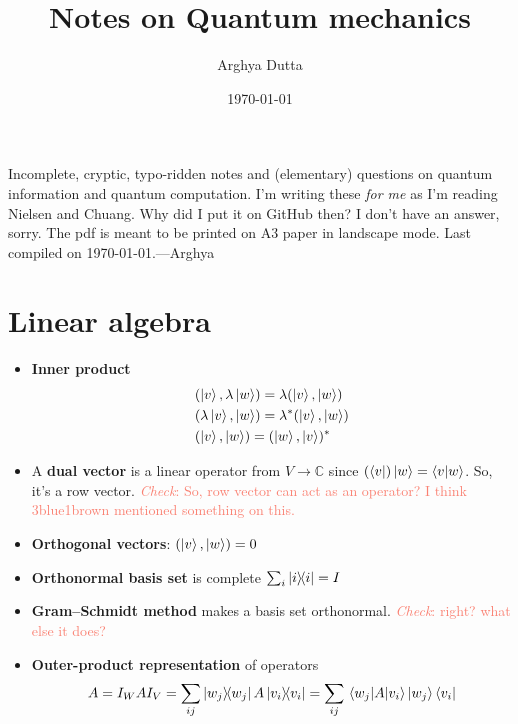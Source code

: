 \documentclass[11pt]{article}
\title{Notes on Quantum mechanics}
\author{Arghya Dutta}
\date{\today}
\newcommand{\q}[1]{\textcolor{Salmon}{\emph{Check}: {#1}}}
\begin{document}

\begin{multicols}{3}
    Incomplete, cryptic, typo-ridden notes and (elementary) questions on quantum information and quantum computation. I'm writing these \textit{for me} as I'm reading Nielsen and Chuang. Why did I put it on GitHub then? I don't have an answer, sorry. The pdf is meant to be printed on A3 paper in landscape mode. Last compiled on \today.---Arghya

    \section{Linear algebra}
    \begin{itemize}

        \item \textbf{Inner product}
              \begin{align}
                   & (\ket{v},\lambda \ket{w}) =\lambda(\ket{v}, \ket{w})  \\
                   & (\lambda\ket{v}, \ket{w})=\lambda^*(\ket{v}, \ket{w}) \\
                   & (\ket{v},\ket{w}) =(\ket{w}, \ket{v})^*
              \end{align}

        \item A \textbf{dual vector} is a linear operator from $V\rightarrow\mathbb{C}$ since $(\bra{v})\ket{w} = \braket{v}{w}$. So, it’s a row vector. \q{So, row vector can act as an operator? I think 3blue1brown mentioned something on this.}

        \item \textbf{Orthogonal vectors}: $(\ket{v}, \ket{w}) = 0$

        \item \textbf{Orthonormal basis set} is complete $\sum_i \dyad{i}  = I$

        \item \textbf{Gram--Schmidt method} makes a basis set orthonormal. \q{right? what else it does?}

        \item \textbf{Outer-product representation} of operators \begin{align}
                  A = I_WAI_V = \sum_{ij}\dyad{w_j}A \dyad{v_i}=\sum_{ij} \mel{w_j}{A}{v_i}\ket{w_j}\bra{v_i}
              \end{align}


\end{itemize}
\end{multicols}
\end{document}
